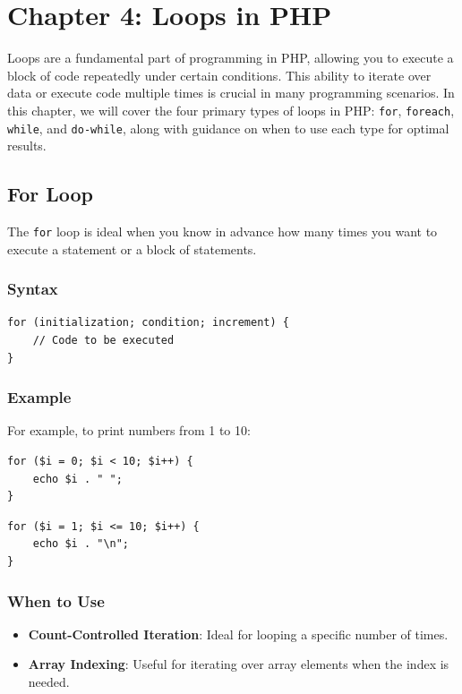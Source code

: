 \documentclass[11pt]{article}
\date{}
\title{}
\begin{document}
\setcounter{tocdepth}{3}
\tableofcontents

\setlength\parindent{10pt}

\section{Chapter 4: Loops in PHP}
\label{sec:org7c729b7}
Loops are a fundamental part of programming in PHP, allowing you to
execute a block of code repeatedly under certain conditions. This
ability to iterate over data or execute code multiple times is crucial
in many programming scenarios. In this chapter, we will cover the four
primary types of loops in PHP: \texttt{for}, \texttt{foreach}, \texttt{while}, and
\texttt{do-while}, along with guidance on when to use each type for optimal
results.

\subsection{For Loop}
\label{sec:org445c697}
The \texttt{for} loop is ideal when you know in advance how many times you want
to execute a statement or a block of statements.

\subsubsection{Syntax}
\label{sec:orgd817606}
\begin{verbatim}
for (initialization; condition; increment) {
    // Code to be executed
}
\end{verbatim}

\subsubsection{Example}
\label{sec:orgefe7679}
For example, to print numbers from 1 to 10:

\begin{verbatim}
for ($i = 0; $i < 10; $i++) {
    echo $i . " ";
}
\end{verbatim}
\begin{verbatim}
for ($i = 1; $i <= 10; $i++) {
    echo $i . "\n";
}
\end{verbatim}

\subsubsection{When to Use}
\label{sec:org479e310}
\begin{itemize}
\item \textbf{Count-Controlled Iteration}: Ideal for looping a specific number of
times.
\item \textbf{Array Indexing}: Useful for iterating over array elements when the
index is needed.
\end{itemize}
\end{document}
